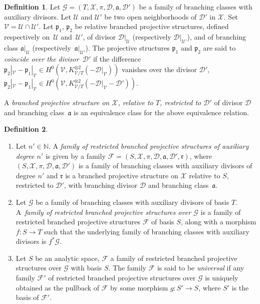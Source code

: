 \documentclass[JEP,XML,SOM,Unicode,NoEqCountersInSection,published]{cedram}
\newcommand{\N}{\mathbb N}
\theoremstyle{definition}
\newtheorem{definition}{Definition}[subsection]
\theoremstyle{plain}
\begin{document}
\begin{definition}
Let $\mathcal G = (T, \mathcal X, \pi, \mathcal D, \mathfrak a, \mathcal D')$ be a family of branching classes with auxiliary divisors.
Let $\mathcal U$ and $\mathcal U'$ be two open neighborhoods of $\mathcal D'$ in $\mathcal X$.
Set $\mathcal V = \mathcal U \cap \mathcal U'$.
Let $\mathfrak p_1$, $\mathfrak p_2$ be relative branched projective structures, defined respectively on~$\mathcal U$ and~$\mathcal U'$, of divisor $\mathcal D|_{\mathcal U}$ (respectively $\mathcal D|_{\mathcal U'}$), and of branching class $\mathfrak a|_{\mathcal U}$ (respectively~$\mathfrak a|_{\mathcal U'}$).
The projective structures $\mathfrak p_1$ and $\mathfrak p_2$ are said to \emph{coincide over the divisor~$\mathcal D'$} if the difference $\mathfrak p_2|_{\mathcal V} - \mathfrak p_1|_{\mathcal V} \in H^0(\mathcal V, K_{\mathcal V/T}^{\otimes 2}(-\mathcal D|_{\mathcal V}))$ vanishes over the divisor $\mathcal D'$, \ie \hbox{$\mathfrak p_2|_{\mathcal V}-\mathfrak p_1|_{\mathcal V} \in H^0(\mathcal V, K_{\mathcal V/T}^{\otimes 2}(-\mathcal D|_{\mathcal V}- \mathcal D'))$}.

A \emph{branched projective structure on $\mathcal X$, relative to $T$, restricted to $\mathcal D'$} of divisor $\mathcal D$ and branching class~$\mathfrak a$ is an equivalence class for the above equivalence relation.
\end{definition}

\skpt
\begin{definition}\label{definition_families_rbps}
\begin{enumerate}
\item
Let $n' \in \N$.
A \emph{family of restricted branched projective structures of auxiliary degree $n'$} is given by a family $\mathcal F = (S, \mathcal X, \pi, \mathcal D, \mathfrak a, \mathcal D', \mathfrak r)$, where $(S, \mathcal X, \pi, \mathcal D, \mathfrak a, \mathcal D')$ is a family of branching classes with auxiliary divisors of degree $n'$ and $\mathfrak r$ is a branched projective structure on $\mathcal X$ relative to $S$, restricted to $\mathcal D'$, with branching divisor $\mathcal D$ and branching class~$\mathfrak a$.
\item
Let $\mathcal G$ be a family of branching classes with auxiliary divisors of basis $T$.
A~\emph{family of restricted branched projective structures over $\mathcal G$} is a family of restricted branched projective structures $\mathcal F$ of basis $S$, along with a morphism $f: S \to T$ such that the underlying family of branching classes with auxiliary divisors is $f^*\mathcal G$.
\item[(iii)]
Let $S$ be an analytic space, $\mathcal F$ a family of restricted branched projective structures over $\mathcal G$ with basis $S$.
The family $\mathcal F$ is said to be \emph{universal} if any family $\mathcal F'$ of restricted branched projective structures over $\mathcal G$ is uniquely obtained as the pullback of $\mathcal F$ by some morphism $g: S' \to S$, where $S'$ is the basis of $\mathcal F'$.
\end{enumerate}
\end{definition}
\end{document}
